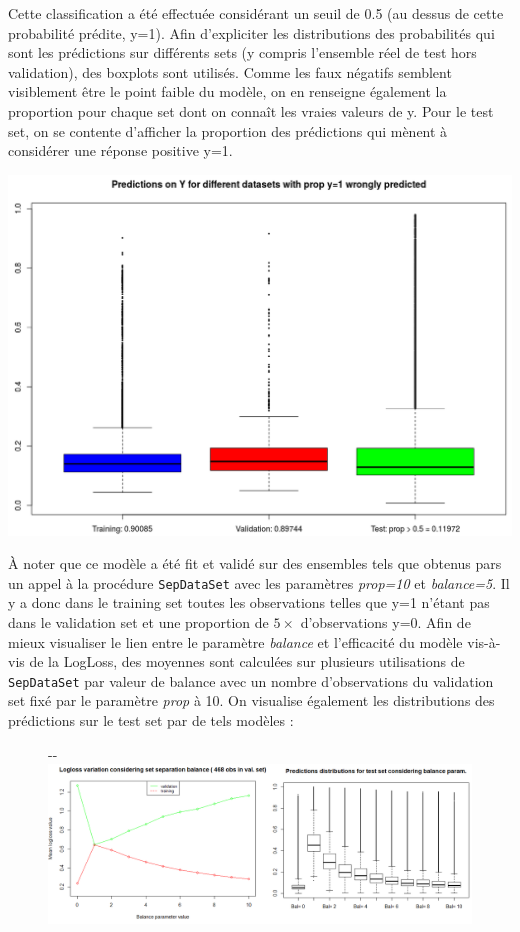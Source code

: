 \documentclass[]{article}
\begin{document}
Cette classification a été effectuée considérant un seuil de 0.5 (au dessus de cette probabilité prédite, y=1). Afin d'expliciter les distributions des probabilités qui sont les prédictions sur différents sets (y compris l'ensemble réel de test hors validation), des boxplots sont utilisés. Comme les faux négatifs semblent visiblement être le point faible du modèle, on en renseigne également la proportion pour chaque set dont on connaît les vraies valeurs de y. Pour le test set, on se contente d'afficher la proportion des prédictions qui mènent à considérer une réponse positive y=1.
\begin{center}
\includegraphics[scale=0.35]{pred_distrib}
\end{center}

À noter que ce modèle a été fit et validé sur des ensembles tels que obtenus pars un appel à la procédure \texttt{SepDataSet} avec les paramètres \textit{prop=10} et \textit{balance=5}. Il y a donc dans le training set toutes les observations telles que y=1 n'étant pas dans le validation set et une proportion de $5 \times$ d'observations y=0. Afin de mieux visualiser le lien entre le paramètre \textit{balance} et l'efficacité du modèle vis-à-vis de la LogLoss, des moyennes sont calculées sur plusieurs utilisations de \texttt{SepDataSet} par valeur de balance avec un nombre d'observations du validation set fixé par le paramètre \textit{prop} à 10. On visualise également les distributions des prédictions sur le test set par de tels modèles :

\begin{figure}[!ht]
   \begin{adjustwidth}{-\oddsidemargin-1in}{-\rightmargin}
     \centering
     \includegraphics[width=\textwidth]{balance_both}
   \end{adjustwidth}
\end{figure}
\end{document}
